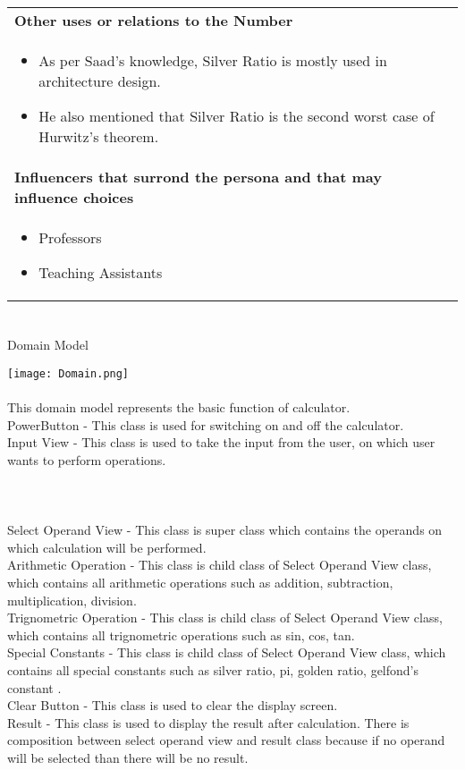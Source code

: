 \documentclass[12pt]{article}
\begin{document}
{\begin{center}
\begin{tabular}{ | m{40em} | }
\\
\hline
\textbf{Other uses or relations to the Number} \\
\begin{itemize}
\item As per Saad's knowledge, Silver Ratio is mostly used in architecture design.
\item He also mentioned that Silver Ratio is the second worst case of Hurwitz's theorem. 
\end{itemize}
\\
\hline
\textbf{Influencers that surrond the persona and that may influence choices} \\
\begin{itemize}
\item Professors
\item Teaching Assistants
\end{itemize}
\\
\hline
\end{tabular}
\end{center}

\section{}

{\centering
{\LARGE Domain Model \par}
\par}
\texttt{[image: Domain.png]}\\\\

This domain model represents the basic function of calculator.\\
PowerButton - This class is used for switching on and off the calculator.\\
Input View - This class is used to take the input from the user, on which user wants to perform operations.\\
\\\\\\
Select Operand View - This class is super class which contains the operands on which calculation will be performed.\\
Arithmetic Operation - This class is child class of Select Operand View class, which contains all arithmetic operations such as addition, subtraction, multiplication, division.\\
Trignometric Operation - This class is child class of Select Operand View class, which contains all trignometric operations such as sin, cos, tan.\\
Special Constants - This class is child class of Select Operand View class, which contains all special constants such as silver ratio, pi, golden ratio, gelfond's constant .\\
Clear Button - This class is used to clear the display screen.\\
Result - This class is used to display the result after calculation. There is composition between select operand view and result class because if no operand will be selected than there will be no result.\\
\newpage
}
\end{document}
